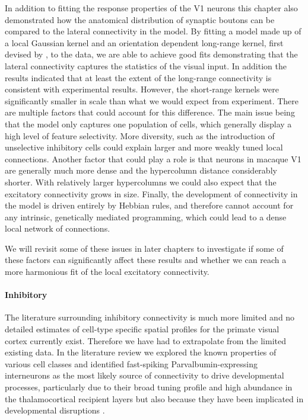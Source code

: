 In addition to fitting the response properties of the V1 neurons this
chapter also demonstrated how the anatomical distribution of synaptic
boutons can be compared to the lateral connectivity in the model. By
fitting a model made up of a local Gaussian kernel and an orientation
dependent long-range kernel, first devised by \cite{Buzas2006}, to the
data, we are able to achieve good fits demonstrating that the lateral
connectivity captures the statistics of the visual input. In addition
the results indicated that at least the extent of the long-range
connectivity is consistent with experimental results. However, the
short-range kernels were significantly smaller in scale than what we
would expect from experiment. There are multiple factors that could
account for this difference. The main issue being that the model only
captures one population of cells, which generally display a high level
of feature selectivity. More diversity, such as the introduction of
unselective inhibitory cells could explain larger and more weakly
tuned local connections. Another factor that could play a role is that
neurons in macaque V1 are generally much more dense and the
hypercolumn distance considerably shorter. With relatively larger
hypercolumns we could also expect that the excitatory connectivity
grows in size. Finally, the development of connectivity in the model
is driven entirely by Hebbian rules, and therefore cannot account for
any intrinsic, genetically mediated programming, which could lead to a
dense local network of connections.

We will revisit some of these issues in later chapters to investigate
if some of these factors can significantly affect these results and
whether we can reach a more harmonious fit of the local excitatory
connectivity.

\paragraph{Inhibitory}

The literature surrounding inhibitory connectivity is much more
limited and no detailed estimates of cell-type specific spatial
profiles for the primate visual cortex currently exist. Therefore we
have had to extrapolate from the limited existing data. In the
literature review we explored the known properties of various cell
classes and identified fast-spiking Parvalbumin-expressing
interneurons as the most likely source of connectivity to drive
developmental processes, particularly due to their broad tuning
profile \citep{Albus1994,Kisvarday1997a,Hofer2011,Ma2011} and high
abundance in the thalamocortical recipient layers
\citep{VanBrederode1990,Hogan1992,Huxlin2001} but also because they
have been implicated in developmental disruptions
\citep{Fagiolini2004,Hensch2004}.

